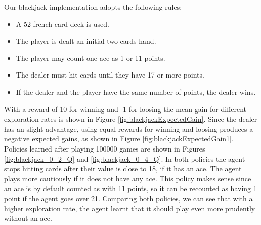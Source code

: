 \documentclass[12pt]{article}
\begin{document}
Our blackjack implementation adopts the following rules:

\begin{itemize}
  \item A 52 french card deck is used.
  \item The player is dealt an initial two cards hand.
  \item The player may count one ace as 1 or 11 points.
  \item The dealer must hit cards until they have 17 or more points.
  \item If the dealer and the player have the same number of points, the dealer wins.
\end{itemize}

With a reward of 10 for winning and -1 for loosing the mean gain for different exploration rates is shown in  Figure \ref{fig:blackjackExpectedGain}.
Since the dealer has an slight advantage, using equal rewards for winning and loosing produces a negative expected gains, as shown in Figure \ref{fig:blackjackExpectedGain1}.
Policies learned after playing 100000 games are shown in Figures \ref{fig:blackjack_0_2_Q} and \ref{fig:blackjack_0_4_Q}.
In both policies the agent stops hitting cards after their value is close to 18, if it has an ace.
The agent plays more cautiously if it does not have any ace.
This policy makes sense since an ace is by default counted as with 11 points, so it can be recounted as having 1 point if the agent goes over 21.
Comparing both policies, we can see that with a higher exploration rate, the agent learnt that it should play even more prudently without an ace.
\end{document}
